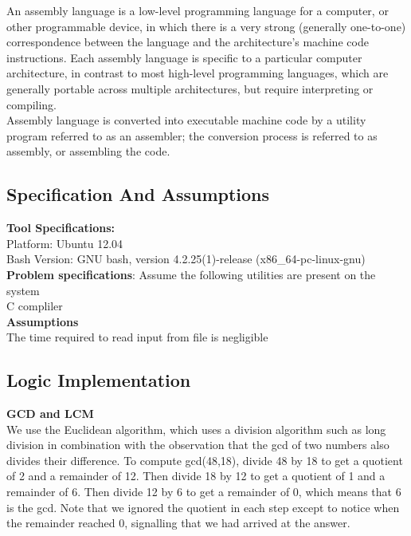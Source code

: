 \documentclass[paper=a4, fontsize=11pt]{scrartcl} %
\numberwithin{equation}{section} %
\numberwithin{figure}{section} %
\numberwithin{table}{section} %
\begin{document}
An assembly language is a low-level programming language for a computer, or other programmable device, in which there is a very strong (generally one-to-one) correspondence between the language and the architecture's machine code instructions. Each assembly language is specific to a particular computer architecture, in contrast to most high-level programming languages, which are generally portable across multiple architectures, but require interpreting or compiling.\\

Assembly language is converted into executable machine code by a utility program referred to as an assembler; the conversion process is referred to as assembly, or assembling the code.\\


\subsection{Specification And Assumptions}
{\textbf {Tool Specifications:}}\\
Platform: Ubuntu 12.04\\
Bash Version: GNU bash, version 4.2.25(1)-release (x86\_64-pc-linux-gnu)\\

\textbf{Problem specifications}:
Assume the following utilities are present on the system\\
C compliler\\

{\textbf{Assumptions}}\\
The time required to read input from file is negligible\\


\subsection{Logic Implementation}
\textbf{GCD and LCM}\\

We use the Euclidean algorithm, which uses a division algorithm such as long division in combination with the observation that the gcd of two numbers also divides their difference. To compute gcd(48,18), divide 48 by 18 to get a quotient of 2 and a remainder of 12. Then divide 18 by 12 to get a quotient of 1 and a remainder of 6. Then divide 12 by 6 to get a remainder of 0, which means that 6 is the gcd. Note that we ignored the quotient in each step except to notice when the remainder reached 0, signalling that we had arrived at the answer.\\
\end{document}
